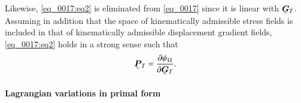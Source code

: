 Likewise, \eqref{eq_0017:eq2} is eliminated from \eqref{eq_0017} since it is linear with $\tensorii{G}{}_{\cell}$. Assuming in addition that the space of kinematically admissible stress fields is included in that of kinematically admissible displacement gradient fields, \eqref{eq_0017:eq2} holds in a strong sense such that
%
%
%
\begin{equation}
    \label{eq_stress}
    \begin{aligned}
        \tensorii{P}{}_{\cell} = \frac{\partial \mecPotential_{\bodyLag}}{\partial \tensorii{G}{}_{\cell}}.
    \end{aligned}
\end{equation}

\paragraph{Lagrangian variations in primal form}

